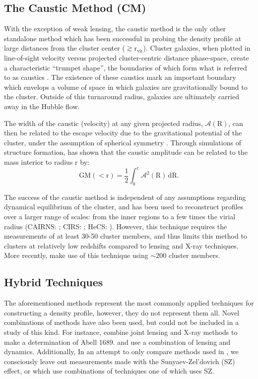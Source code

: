 \subsection{The Caustic Method (CM)}
With the exception of weak lensing, the caustic method is the only other
standalone method which has been successful in probing the density profile at
large distances from the cluster center ($\mathrm{\gtrsim r_{vir}}$). Cluster
galaxies, when plotted in line-of-sight velocity versus projected
cluster-centric distance phase-space, create a characteristic ``trumpet
shape'', the boundaries of which form what is referred to as caustics
\citep{KA87.1,RE89.1}. The existence of these caustics mark an important
boundary which envelops a volume of space in which galaxies are gravitationally
bound to the cluster. Outside of this turnaround radius, galaxies are
ultimately carried away in the Hubble flow.

The width of the caustic (velocity) at any given projected radius,
$\mathcal{A}\mathrm{(R)}$, can then be related to the escape velocity due to
the gravitational potential of the cluster, under the assumption of spherical
symmetry \citep{DI97.1}. Through simulations of structure formation,
\citet{DI99.1} has shown that the caustic amplitude can be related to the mass
interior to radius $\mathrm{r}$ by: 
\begin{equation}
\mathrm{GM(<r) = \frac{1}{2} \int_{0}^{r} \mathcal{A}^{2}(R) \, dR }.
\end{equation}

The success of the caustic method is independent of any assumptions regarding
dynamical equilibrium of the cluster, and has been used to reconstruct profiles
over a larger range of scales: from the inner regions to a few times the virial
radius (CAIRNS: \citealt{RI03.1}; CIRS: \citealt{RI06.1}; HeCS:
\citealt{RI13.1}). However, this technique requires the measurements of at
least 30-50 cluster members, and thus limits this method to clusters at relatively low
redshifts compared to lensing and X-ray techniques. More recently,
\citet{RI13.1} make use of this technique using $\mathrm{\sim 200}$ cluster
members.

\subsection{Hybrid Techniques}
The aforementioned methods represent the most commonly applied techniques for
constructing a density profile, however, they do not represent them all. Novel
combinations of methods have also been used, but could not be included in a
study of this kind. For instance, \citet{LE08.1} combine joint lensing and
X-ray methods to make a determination of Abell 1689. \citet{TH10.1} and
\citet{VE11.1} use a combination of lensing and dynamics. Additionally, In an
attempt to only compare methods used in \citet{CO07.1}, we consciously
leave out measurements made with the Sunyaev-Zel'dovich (SZ) effect, or which use
combinations of techniques one of which uses SZ.


